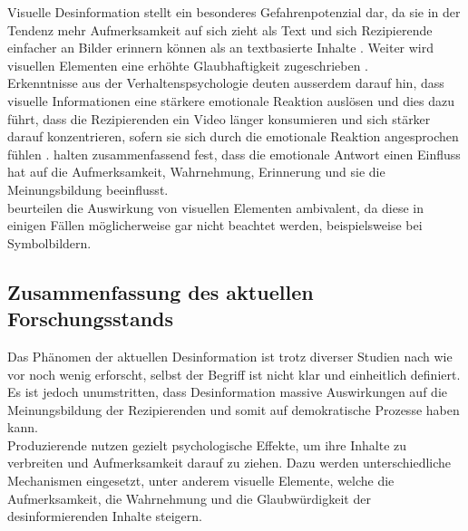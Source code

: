 \documentclass[12pt,a4paper]{article}        %
\begin{document}
Visuelle Desinformation stellt ein besonderes Gefahrenpotenzial dar, da sie in der Tendenz mehr Aufmerksamkeit auf sich zieht als Text \parencites[3701]{weikmann_visual_2023} und sich Rezipierende einfacher an Bilder erinnern können als an textbasierte Inhalte \parencite{grady_neural_1998}. Weiter wird visuellen Elementen eine erhöhte Glaubhaftigkeit zugeschrieben \parencite[3703f]{weikmann_visual_2023}.\\
Erkenntnisse aus der Verhaltenspsychologie deuten ausserdem darauf hin, dass visuelle Informationen eine stärkere emotionale Reaktion auslösen \parencite[3703]{weikmann_visual_2023} und dies dazu führt, dass die Rezipierenden ein Video länger konsumieren und sich stärker darauf konzentrieren, sofern sie sich durch die emotionale Reaktion angesprochen fühlen \parencite[146]{teixeira_emotion-induced_2012}. \textcite[23]{zhou_effects_2005} halten zusammenfassend fest, dass die emotionale Antwort einen Einfluss hat auf die Aufmerksamkeit, Wahrnehmung, Erinnerung und sie die Meinungsbildung beeinflusst. \\
\textcite[501]{schaewitz_when_2020} beurteilen die Auswirkung von visuellen Elementen ambivalent, da diese in einigen Fällen möglicherweise gar nicht beachtet werden, beispielsweise bei Symbolbildern.

\subsection{Zusammenfassung des aktuellen Forschungsstands}
Das Phänomen der aktuellen Desinformation ist trotz diverser Studien nach wie vor noch wenig erforscht, selbst der Begriff ist nicht klar und einheitlich definiert. Es ist jedoch unumstritten, dass Desinformation massive Auswirkungen auf die Meinungsbildung der Rezipierenden und somit auf demokratische Prozesse haben kann. \\
Produzierende nutzen gezielt psychologische Effekte, um ihre Inhalte zu verbreiten und Aufmerksamkeit darauf zu ziehen. Dazu werden unterschiedliche Mechanismen eingesetzt, unter anderem visuelle Elemente, welche die Aufmerksamkeit, die Wahrnehmung und die Glaubwürdigkeit der desinformierenden Inhalte steigern.
\end{document}
